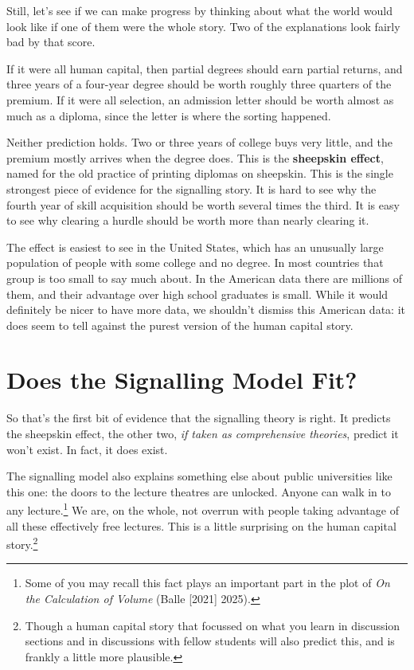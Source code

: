 \documentclass[
  11pt,
  letterpaper,
]{scrbook}
\begin{document}
Still, let's see if we can make progress by thinking about what the
world would look like if one of them were the whole story. Two of the
explanations look fairly bad by that score.

If it were all human capital, then partial degrees should earn partial
returns, and three years of a four-year degree should be worth roughly
three quarters of the premium. If it were all selection, an admission
letter should be worth almost as much as a diploma, since the letter is
where the sorting happened.

Neither prediction holds. Two or three years of college buys very
little, and the premium mostly arrives when the degree does. This is the
\textbf{sheepskin effect}, named for the old practice of printing
diplomas on sheepskin. This is the single strongest piece of evidence
for the signalling story. It is hard to see why the fourth year of skill
acquisition should be worth several times the third. It is easy to see
why clearing a hurdle should be worth more than nearly clearing it.

The effect is easiest to see in the United States, which has an
unusually large population of people with some college and no degree. In
most countries that group is too small to say much about. In the
American data there are millions of them, and their advantage over high
school graduates is small. While it would definitely be nicer to have
more data, we shouldn't dismiss this American data: it does seem to tell
against the purest version of the human capital story.

\section{Does the Signalling Model Fit?}\label{sec-does-signalling}

So that's the first bit of evidence that the signalling theory is right.
It predicts the sheepskin effect, the other two, \emph{if taken as
comprehensive theories}, predict it won't exist. In fact, it does exist.

The signalling model also explains something else about public
universities like this one: the doors to the lecture theatres are
unlocked. Anyone can walk in to any lecture.\footnote{Some of you may
  recall this fact plays an important part in the plot of \emph{On the
  Calculation of Volume} (Balle {[}2021{]} 2025).} We are, on the whole,
not overrun with people taking advantage of all these effectively free
lectures. This is a little surprising on the human capital
story.\footnote{Though a human capital story that focussed on what you
  learn in discussion sections and in discussions with fellow students
  will also predict this, and is frankly a little more plausible.}
\end{document}

